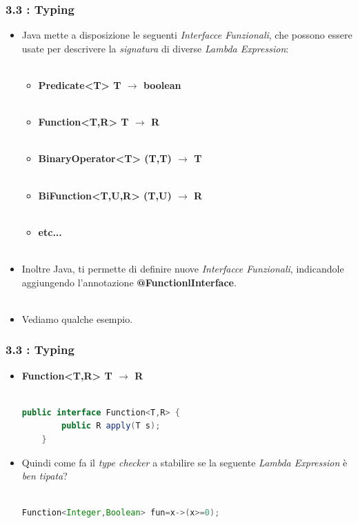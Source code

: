 \documentclass{beamer}
\begin{document}
\begin{frame}
	\frametitle{\textbf{3.3 : Typing}}
	\begin{itemize}
		\item
			Java mette a disposizione le seguenti \textit{Interfacce Funzionali}, che possono essere usate per descrivere la \textit{signatura} di diverse \textit{Lambda Expression}:\\\
			\begin{itemize}
				\item
					\textbf{Predicate<T> \quad T $\rightarrow$ boolean}\\\
				\item
					\textbf{Function<T,R> \quad T $\rightarrow$ R}\\\
				\item
					\textbf{BinaryOperator<T> \quad (T,T) $\rightarrow$ T}\\\
				\item
					\textbf{BiFunction<T,U,R> \quad (T,U) $\rightarrow$ R}\\\
				\item
					\textbf{etc...}\\\
			\end{itemize}
		\item
			Inoltre Java, ti permette di definire nuove \textit{Interfacce Funzionali}, indicandole aggiungendo l'annotazione \textbf{@FunctionlInterface}.\\\
		\item
			Vediamo qualche esempio.
	\end{itemize}
\end{frame}


\begin{frame}[fragile]
	\frametitle{\textbf{3.3 : Typing}}
	\begin{itemize}
		\item
			\textbf{Function<T,R> \quad T $\rightarrow$ R}\\\
\begin{lstlisting}[language=Java]
	public interface Function<T,R> {
		public R apply(T s);
	}
\end{lstlisting}
		\item 
			Quindi come fa il \textit{type checker} a stabilire se la seguente \textit{Lambda Expression} è \textit{ben tipata}?\\\
\begin{lstlisting}[language=Java]
	Function<Integer,Boolean> fun=x->(x>=0);
\end{lstlisting}
	\end{itemize}
\end{frame}
\end{document}

